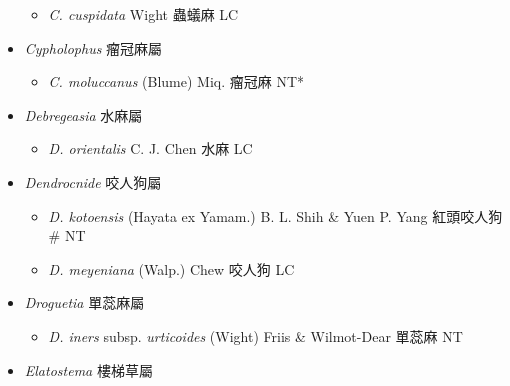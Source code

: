 \begin{itemize}
  \begin{itemize}
        \item[] \textit{C. cuspidata} Wight  蟲蟻麻   LC
  \end{itemize}
 \item[] \textit{Cypholophus} 瘤冠麻屬
                                
  \begin{itemize}
        \item[] \textit{C. moluccanus} (Blume) Miq.  瘤冠麻   NT*
  \end{itemize}
 \item[] \textit{Debregeasia} 水麻屬
                                
  \begin{itemize}
        \item[] \textit{D. orientalis} C. J. Chen  水麻   LC
  \end{itemize}
 \item[] \textit{Dendrocnide} 咬人狗屬
                                
  \begin{itemize}
        \item[] \textit{D. kotoensis} (Hayata ex Yamam.) B. L. Shih \& Yuen P. Yang  紅頭咬人狗  \# NT
        \item[] \textit{D. meyeniana} (Walp.) Chew  咬人狗   LC
  \end{itemize}
 \item[] \textit{Droguetia} 單蕊麻屬
                                
  \begin{itemize}
        \item[] \textit{D. iners} subsp. \textit{urticoides} (Wight) Friis \& Wilmot-Dear  單蕊麻   NT
  \end{itemize}
 \item[] \textit{Elatostema} 樓梯草屬
                                

\end{itemize}
